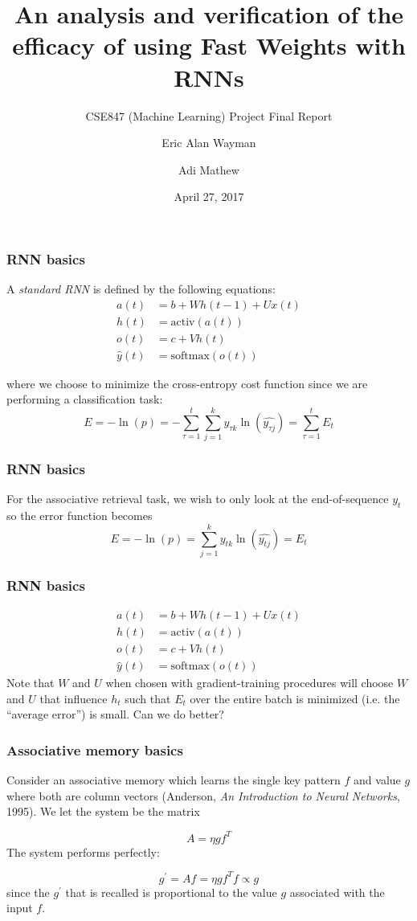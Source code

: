 \documentclass{beamer}
\title{An analysis and verification of the efficacy of using Fast Weights with RNNs}
\subtitle{CSE847 (Machine Learning) Project Final Report}
\author{Eric Alan Wayman\inst{1} \and Adi Mathew\inst{1}}
\institute[Universities Here and There] %
{
  \inst{1}%
  Department of Computer Science and Engineering\\
  Michigan State University
}
\date{April 27, 2017}
\begin{document}
\frame{\titlepage}

\begin{frame}
  \frametitle{RNN basics}
  \begin{definition}
    A \emph{standard RNN} is defined by the following equations:
    \begin{align*}
      a(t) & = b + W h(t-1) + U x(t) \\
      h(t) & = \mbox{activ}(a(t)) \\
      o(t) & = c + V h(t) \\
      \widehat{y}(t) & = \mbox{softmax}(o(t))
    \end{align*}
  \end{definition}
  where we choose to minimize the cross-entropy cost function since we are performing a classification task:
  \begin{equation*}
    E = -\ln(p) = -\sum_{\tau=1}^t \sum_{j=1}^k y_{\tau k} \ln\left(\widehat{y_{\tau j}}\right) = \sum_{\tau=1}^{t} E_t
  \end{equation*}
\end{frame}

\begin{frame}
  \frametitle{RNN basics}
  For the associative retrieval task, we wish to only look at the end-of-sequence $y_t$ so the error function becomes
  \begin{equation*}
    E = -\ln(p) = \sum_{j=1}^k y_{t k} \ln\left(\widehat{y_{t j}}\right) = E_t
  \end{equation*}
\end{frame}

\begin{frame}
  \frametitle{RNN basics}
    \begin{align*}
      a(t) & = b + W h(t-1) + U x(t) \\
      h(t) & = \mbox{activ}(a(t)) \\
      o(t) & = c + V h(t) \\
      \widehat{y}(t) & = \mbox{softmax}(o(t))
    \end{align*}
  Note that $W$ and $U$ when chosen with gradient-training procedures will choose $W$ and $U$ that influence $h_t$ such that $E_t$ over the entire batch is minimized (i.e. the ``average error'') is small. Can we do better?
\end{frame}

\begin{frame}
  \frametitle{Associative memory basics}
Consider an associative memory which learns the single key pattern $f$ and value $g$ where both are column vectors (Anderson, \emph{An Introduction to Neural Networks}, 1995). We let the system be the matrix

\begin{equation*}
A = \eta g f^T
\end{equation*}
%
The system performs perfectly:

\begin{equation*}
g^\prime = Af = \eta g f^T f \propto g
\end{equation*}
%
since the $g^\prime$ that is recalled is proportional to the value $g$ associated with the input $f$.
\end{frame}
\end{document}
